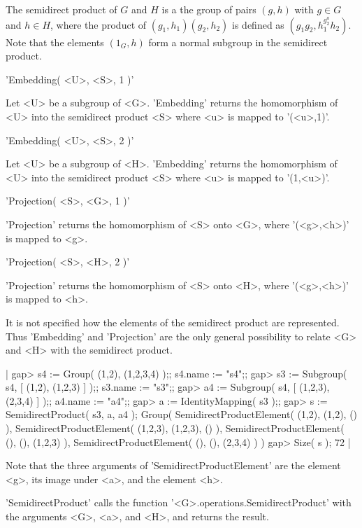 The semidirect product  of $G$ and $H$  is a the  group of  pairs $(g,h)$
with $g \in G$ and  $h \in H$, where the product of $(g_1,h_1) (g_2,h_2)$
is defined as  $(g_1 g_2,  h_1^{g_2^a}  h_2)$.  Note  that  the  elements
$(1_G,h)$ form a normal subgroup in the semidirect product.

\vspace{5mm}
'Embedding( <U>, <S>, 1 )'

Let <U>  be  a subgroup of <G>.  'Embedding' returns  the homomorphism of
<U> into the semidirect product <S> where <u> is mapped to '(<u>,1)'.

'Embedding( <U>, <S>, 2 )'%

Let <U> be a subgroup  of <H>.   'Embedding'  returns the homomorphism of
<U> into the semidirect product <S> where <u> is mapped to '(1,<u>)'.

\vspace{5mm}
'Projection( <S>, <G>, 1 )'%

'Projection' returns  the homomorphism of <S> onto <G>, where '(<g>,<h>)'
is mapped to <g>.

'Projection( <S>, <H>, 2 )'

'Projection' returns the homomorphism of <S> onto <H>, where '(<g>,<h>)'
is mapped to <h>.

It is  not specified how  the  elements  of  the  semidirect product  are
represented.   Thus  'Embedding'  and 'Projection'  are the  only general
possibility to relate <G> and <H> with the semidirect product.

|    gap> s4 := Group( (1,2), (1,2,3,4) );;  s4.name := "s4";;
    gap> s3 := Subgroup( s4, [ (1,2), (1,2,3) ] );; s3.name := "s3";;
    gap> a4 := Subgroup( s4, [ (1,2,3), (2,3,4) ] );;  a4.name := "a4";;
    gap> a := IdentityMapping( s3 );;
    gap> s := SemidirectProduct( s3, a, a4 );
    Group( SemidirectProductElement( (1,2),
    (1,2), () ), SemidirectProductElement( (1,2,3),
    (1,2,3), () ), SemidirectProductElement( (), (),
    (1,2,3) ), SemidirectProductElement( (), (), (2,3,4) ) )
    gap> Size( s );
    72 |

Note  that  the three  arguments  of  'SemidirectProductElement'  are the
element <g>, its image under <a>, and the element <h>.

'SemidirectProduct' calls the function '<G>.operations.SemidirectProduct'
with the arguments <G>, <a>, and <H>, and returns the result.

